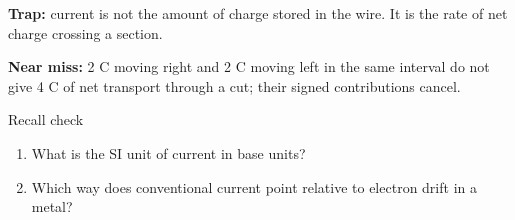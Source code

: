 \documentclass[11pt]{article}
\begin{document}
\begin{keepsection}
\begin{notebox}\textbf{Trap:} current is not the amount of charge stored in the wire. It is the rate of net charge crossing a section.\end{notebox}

\begin{notebox}\textbf{Near miss:} 2 C moving right and 2 C moving left in the same interval do not give 4 C of net transport through a cut; their signed contributions cancel.\end{notebox}

\begin{recallbox}{Recall check}
\begin{enumerate}
\item What is the SI unit of current in base units?
\item Which way does conventional current point relative to electron drift in a metal?
\end{enumerate}

\end{recallbox}
\end{keepsection}
\end{document}
